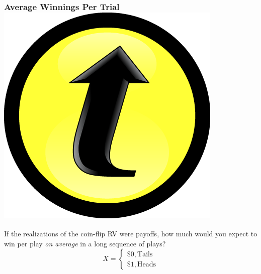 \documentclass[handout]{beamer}
\begin{document}


%  

\begin{frame}
\frametitle{Average Winnings Per Trial \hfill \includegraphics[scale = 0.05]{./images/clicker}}
If the realizations of the coin-flip RV were \alert{payoffs}, how much would you expect to win per play \emph{on average} in a long sequence of plays?
$$X = \left\{ \begin{array}{l}  \$0, \mbox{Tails}\\ \$1, \mbox{Heads}\end{array} \right.$$
\end{frame}
\end{document}
